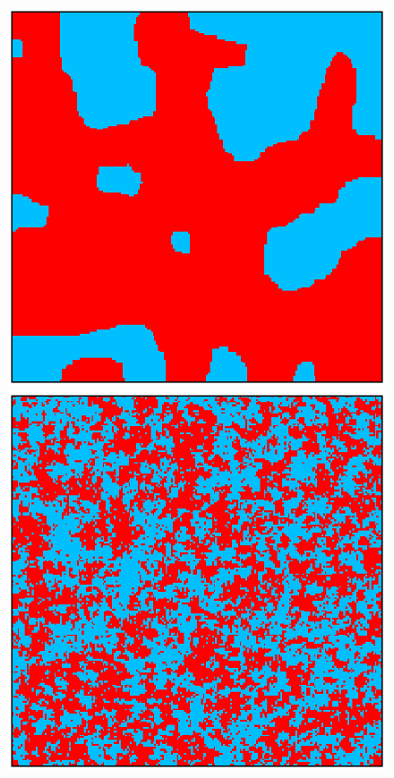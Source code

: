\begin{figure}[h]
    \centering 
    \noindent\begin{minipage}[c]{0.32\textwidth}
        \centering
        \includegraphics[scale=0.38]{./images/ising/T_001_ferro.eps}
    \end{minipage}%
    \hfill
    \begin{minipage}[c]{0.32\textwidth}
        \centering
        \includegraphics[scale=0.38]{./images/ising/T_065_ferro.eps}

\end{minipage}
\end{figure}
